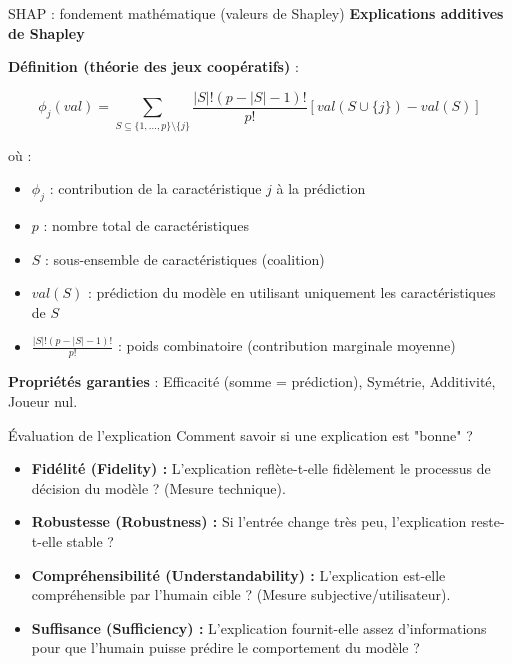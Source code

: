 \documentclass[9pt, aspectratio=169]{beamer}
\begin{document}
\begin{frame}{SHAP : fondement mathématique (valeurs de Shapley)}
    \textbf{Explications additives de Shapley}
    
    \vspace{0.3cm}
    \textbf{Définition (théorie des jeux coopératifs)} :
    
    \[
    \phi_j(val) = \sum_{S \subseteq \{1,\ldots,p\} \setminus \{j\}} \frac{|S|!(p-|S|-1)!}{p!} \left[ val(S \cup \{j\}) - val(S) \right]
    \]
    
    \vspace{0.2cm}
    où :
    \begin{itemize}
        \item \(\phi_j\) : contribution de la caractéristique \(j\) à la prédiction
        \item \(p\) : nombre total de caractéristiques
        \item \(S\) : sous-ensemble de caractéristiques (coalition)
        \item \(val(S)\) : prédiction du modèle en utilisant uniquement les caractéristiques de \(S\)
        \item \(\frac{|S|!(p-|S|-1)!}{p!}\) : poids combinatoire (contribution marginale moyenne)
    \end{itemize}
    
    \vspace{0.2cm}
    \textbf{Propriétés garanties} : Efficacité (somme = prédiction), Symétrie, Additivité, Joueur nul.
\end{frame}

\begin{frame}{Évaluation de l'explication}
    Comment savoir si une explication est "bonne" ? \parencite{Burkart2021A}
    \begin{itemize}
        \item \textbf{Fidélité (Fidelity) :} L'explication reflète-t-elle fidèlement le processus de décision du modèle ? (Mesure technique).
        \item \textbf{Robustesse (Robustness) :} Si l'entrée change très peu, l'explication reste-t-elle stable ?
        \item \textbf{Compréhensibilité (Understandability) :} L'explication est-elle compréhensible par l'humain cible ? (Mesure subjective/utilisateur).
        \item \textbf{Suffisance (Sufficiency) :} L'explication fournit-elle assez d'informations pour que l'humain puisse prédire le comportement du modèle ?
    \end{itemize}
\end{frame}
\end{document}
